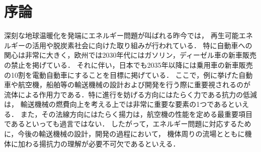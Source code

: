 
\section{序論}

深刻な地球温暖化を発端にエネルギー問題が叫ばれる昨今では，
再生可能エネルギーの活用や脱炭素社会に向けた取り組み\cite{2021_roadmap}が行われている．
特に自動車への関心は非常に大きく，欧州では2030年代にはガソリン，ディーゼル車の新車販売の禁止を掲げている．
それに伴い，日本でも2035年以降には乗用車の新車販売の10割を電動自動車にすることを目標に掲げている．
ここで，例に挙げた自動車や航空機，船舶等の輸送機械の設計および開発を行う際に重要視されるのが
流体による作用力である．特に進行を妨げる方向にはたらく力である抗力の低減は，
輸送機械の燃費向上を考える上では非常に重要な要素の1つであるといえる．
また，その法線方向にはたらく揚力は，航空機の性能を定める最重要項目であるといっても過言ではない．
したがって，エネルギー問題に対応するために，今後の輸送機械の設計，開発の過程において，
機体周りの流場とともに機体に加わる揚抗力の理解が必要不可欠であるといえる．

